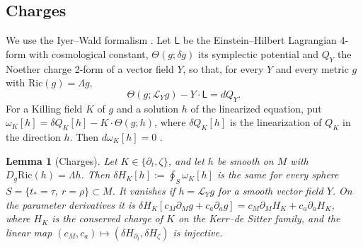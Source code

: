 \documentclass[11pt]{amsart}
\newtheorem{lemma}[theorem]{Lemma}
\theoremstyle{definition}
\theoremstyle{remark}
\numberwithin{equation}{section}
\newcommand{\cL}{\mathcal{L}}
\begin{document}
\subsection{Charges}
We use the Iyer--Wald formalism \cite{IW94}. Let $\mathsf L$ be the Einstein--Hilbert Lagrangian 4-form with cosmological
constant, $\Theta(g;\delta g)$ its symplectic potential and $Q_Y$ the Noether charge 2-form of a vector field $Y$, so that,
for every $Y$ and every metric $g$ with $\mathrm{Ric}(g)=\Lambda g$,
\begin{equation}\label{eq:noether}
\Theta(g;\cL_Yg)-Y\cdot\mathsf L=dQ_Y .
\end{equation}
For a Killing field $K$ of $g$ and a solution $h$ of the linearized equation, put
$\omega_K[h]=\delta Q_K[h]-K\cdot\Theta(g;h)$, where $\delta Q_K[h]$ is the linearization of $Q_K$ in the direction $h$.
Then $d\omega_K[h]=0$ \cite{IW94}.

\begin{lemma}[Charges]\label{lem:charges}
Let $K\in\{\partial_t,\zeta\}$, and let $h$ be smooth on $M$ with $D_g\mathrm{Ric}(h)=\Lambda h$. Then
$\delta H_K[h]:=\oint_S\omega_K[h]$ is the same for every sphere $S=\{t_*=\tau,\ r=\rho\}\subset M$. It vanishes if
$h=\cL_Yg$ for a smooth vector field $Y$. On the parameter derivatives it is
$\delta H_K[c_M\partial_Mg+c_a\partial_ag]=c_M\partial_MH_K+c_a\partial_aH_K$, where $H_K$ is the conserved charge of $K$
on the Kerr--de Sitter family, and the linear map $(c_M,c_a)\mapsto(\delta H_{\partial_t},\delta H_\zeta)$ is injective.
\end{lemma}
\end{document}
